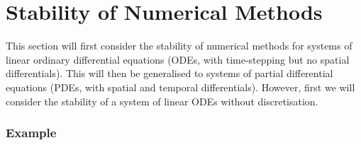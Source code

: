 {\begin{enumerate}
\end{enumerate}
}

\clearpage{}


\section{Stability of Numerical Methods}

This section will first consider the stability of numerical methods
for systems of linear ordinary differential equations (ODEs, with
time-stepping but no spatial differentials). This will then be generalised
to systems of partial differential equations (PDEs, with spatial and
temporal differentials). However, first we will consider the stability
of a system of linear ODEs without discretisation.

\clearpage{}


\subsubsection{Example}

